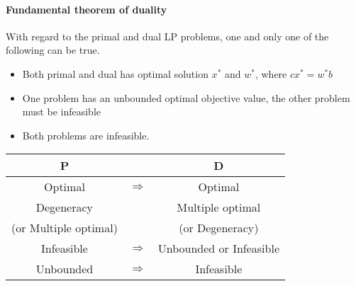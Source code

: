                 \paragraph{Fundamental theorem of duality}
                    With regard to the primal and dual LP problems, one and only one of the following can be true. 

                    \begin{itemize}
                        \item Both primal and dual has optimal solution $x^*$ and $w^*$, where $cx^* = w^*b$
                        \item One problem has an unbounded optimal objective value, the other problem must be infeasible
                        \item Both problems are infeasible.
                    \end{itemize}

                    \begin{table}[!htp]
                        \centering
                        \begin{tabular}{|c|c|c|}
                            \hline P & & D \\
                            \hline Optimal & $\Rightarrow$ & Optimal \\
                            Degeneracy & & Multiple optimal \\
                            (or Multiple optimal) & & (or Degeneracy) \\
                            \hline Infeasible & $\Rightarrow$ & Unbounded or Infeasible \\
                            \hline Unbounded & $\Rightarrow$ & Infeasible \\
                            \hline
                        \end{tabular}
                    \end{table}

